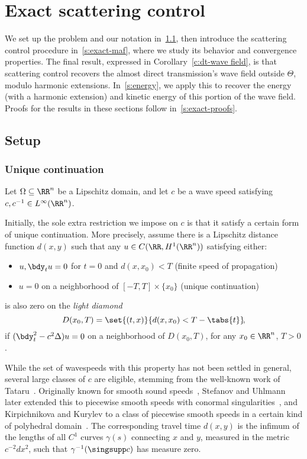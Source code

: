 \documentclass[10pt]{article}
\theoremstyle{plain}
\theoremstyle{definition}
\theoremstyle{remark}
\numberwithin{theorem}{section}
\numberwithin{example}{section}
\numberwithin{equation}{section}
\numberwithin{figure}{section}
\newcommand\sref[1]{\textsection\ref{#1}}					%
\let\d\bdy 						%
\begin{document}
\section{Exact scattering control}					\label{s:exact}

We set up the problem and our notation in~\sref{s:exact-setup}, then introduce the scattering control procedure in~\sref{s:exact-maf}, where we study its behavior and convergence properties. The final result, expressed in Corollary~\ref{c:dt-wave field}, is that scattering control recovers the almost direct transmission's wave field outside $\Theta$, modulo harmonic extensions. In~\sref{s:energy}, we apply this to recover the energy (with a harmonic extension) and kinetic energy of this portion of the wave field. Proofs for the results in these sections follow in~\sref{s:exact-proofs}.


\subsection{Setup}								\label{s:exact-setup}


\subsubsection{Unique continuation}					\label{s:uc}

Let $\Omega\subseteq\RR^n$ be a Lipschitz domain, and let $c$ be a wave speed satisfying $c,c^{-1} \in L^\infty(\RR^n)$. 

Initially, the sole extra restriction we impose on $c$ is that it satisfy a certain form of unique continuation. More precisely, assume there is a Lipschitz distance function $d(x,y)$ such that any $u\in C(\RR, H^1(\RR^n))$ satisfying either:
\pagebreak
\begin{itemize}
	\item $u,\d_t u=0$ for $t=0$ and $d(x,x_0)<T$ (finite speed of propagation)
	\item $u=0$ on a neighborhood of $[-T,T]\times\{x_0\}$ (unique continuation)
\end{itemize}
is also zero on the \emph{light diamond}
	\[
		D(x_0,T) = \set{(t,x)}{d(x,x_0)<T-\tabs{t}}\!,
	\]
if $(\d_t^2-c^2\Delta) u=0$ on a neighborhood of $D(x_0,T)$, for any $x_0\in\RR^n$, $T>0$.

While the set of wavespeeds with this property has not been settled in general, several large classes of $c$ are eligible, stemming from the well-known work of Tataru~\cite{Tataru}. Originally known for smooth sound speeds~\cite[Theorem 4]{SU-TATVariable}, Stefanov and Uhlmann later extended this to piecewise smooth speeds with conormal singularities~\cite[Theorem 6.1]{SU-TATBrain}, and Kirpichnikova and Kurylev to a class of piecewise smooth speeds in a certain kind of polyhedral domain~\cite[]{KK}. The corresponding travel time $d(x,y)$ is the infimum of the lengths of all $C^1$ curves $\gamma(s)$ connecting $x$ and $y$, measured in the metric $c^{-2}dx^2$, such that $\gamma^{-1}(\singsupp c)$ has measure zero.
\end{document}
